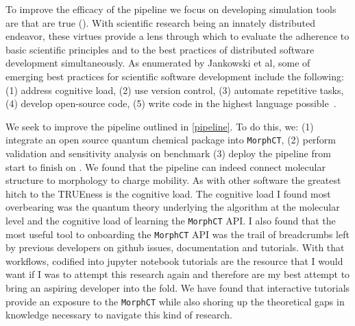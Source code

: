 To improve the efficacy of the pipeline we focus on
developing simulation tools are that are
\gls{true} (\cite{Cummings2017}).
With scientific research being an innately distributed endeavor, these virtues provide a lens through which to
evaluate the adherence to basic scientific principles and to the best practices of distributed software development
simultaneously. As enumerated by Jankowski et al, some of emerging best practices for scientific software
development include the following: (1) address cognitive load, (2) use version control, (3) automate
repetitive tasks, (4) develop open-source code, (5) write code in the highest language possible~\cite{Jankowski2020}.

We seek to improve the pipeline outlined in \autoref{pipeline}.
To do this, we: (1) integrate an open source quantum chemical package into \texttt{MorphCT},
(2) perform validation and sensitivity analysis on benchmark 
(3) deploy the pipeline from start to finish on . 
We found that the pipeline can indeed connect molecular structure to morphology to charge
mobility. As with other software the greatest hitch to the TRUEness is the
cognitive load. The cognitive load I found most overbearing was the quantum theory underlying the algorithm 
at the molecular level and the cognitive load of learning the \texttt{MorphCT} API. 
I also found that the most useful tool to onboarding the \texttt{MorphCT} API was the
trail of breadcrumbs left by previous developers on github issues, documentation and tutorials. 
With that workflows, codified into jupyter notebook tutorials are the resource that I would want if I was to
attempt this research again and therefore are my best attempt to bring an aspiring developer into the fold.
We have found that interactive tutorials provide an exposure to the \texttt{MorphCT} while also shoring up the
theoretical gaps in knowledge necessary to navigate this kind of research. 

